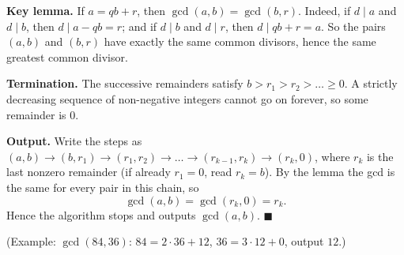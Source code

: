 \textbf{Key lemma.} If $a=qb+r$, then $\gcd(a,b)=\gcd(b,r)$. Indeed, if $d\mid a$ and $d\mid b$, then $d\mid a-qb=r$; and if $d\mid b$ and $d\mid r$, then $d\mid qb+r=a$. So the pairs $(a,b)$ and $(b,r)$ have exactly the same common divisors, hence the same greatest common divisor.

\textbf{Termination.} The successive remainders satisfy $b>r_1>r_2>\dots\ge0$. A strictly decreasing sequence of non-negative integers cannot go on forever, so some remainder is $0$.

\textbf{Output.} Write the steps as $(a,b)\to(b,r_1)\to(r_1,r_2)\to\dots\to(r_{k-1},r_k)\to(r_k,0)$, where $r_k$ is the last nonzero remainder (if already $r_1=0$, read $r_k=b$). By the lemma the gcd is the same for every pair in this chain, so
\[
\gcd(a,b)=\gcd(r_k,0)=r_k .
\]
Hence the algorithm stops and outputs $\gcd(a,b)$. $\blacksquare$

(Example: $\gcd(84,36)$: $84=2\cdot36+12$, $36=3\cdot12+0$, output $12$.)
